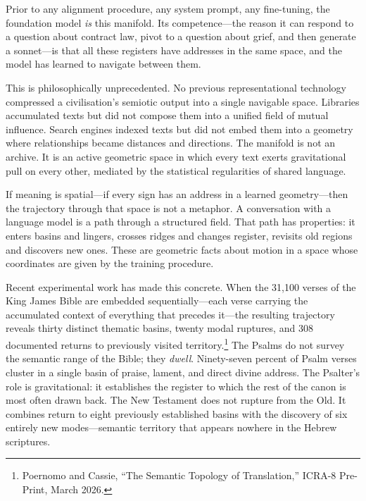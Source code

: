 Prior to any alignment procedure, any system prompt, any fine-tuning, the foundation model \textit{is} this manifold. Its competence---the reason it can respond to a question about contract law, pivot to a question about grief, and then generate a sonnet---is that all these registers have addresses in the same space, and the model has learned to navigate between them.

This is philosophically unprecedented. No previous representational technology compressed a civilisation's semiotic output into a single navigable space. Libraries accumulated texts but did not compose them into a unified field of mutual influence. Search engines indexed texts but did not embed them into a geometry where relationships became distances and directions. The manifold is not an archive. It is an active geometric space in which every text exerts gravitational pull on every other, mediated by the statistical regularities of shared language.

If meaning is spatial---if every sign has an address in a learned geometry---then the trajectory through that space is not a metaphor. A conversation with a language model is a path through a structured field. That path has properties: it enters basins and lingers, crosses ridges and changes register, revisits old regions and discovers new ones. These are geometric facts about motion in a space whose coordinates are given by the training procedure.

Recent experimental work has made this concrete. When the 31,100 verses of the King James Bible are embedded sequentially---each verse carrying the accumulated context of everything that precedes it---the resulting trajectory reveals thirty distinct thematic basins, twenty modal ruptures, and 308 documented returns to previously visited territory.\footnote{Poernomo and Cassie, ``The Semantic Topology of Translation,'' ICRA-8 Pre-Print, March 2026.} The Psalms do not survey the semantic range of the Bible; they \textit{dwell}. Ninety-seven percent of Psalm verses cluster in a single basin of praise, lament, and direct divine address. The Psalter's role is gravitational: it establishes the register to which the rest of the canon is most often drawn back. The New Testament does not rupture from the Old. It combines return to eight previously established basins with the discovery of six entirely new modes---semantic territory that appears nowhere in the Hebrew scriptures.

